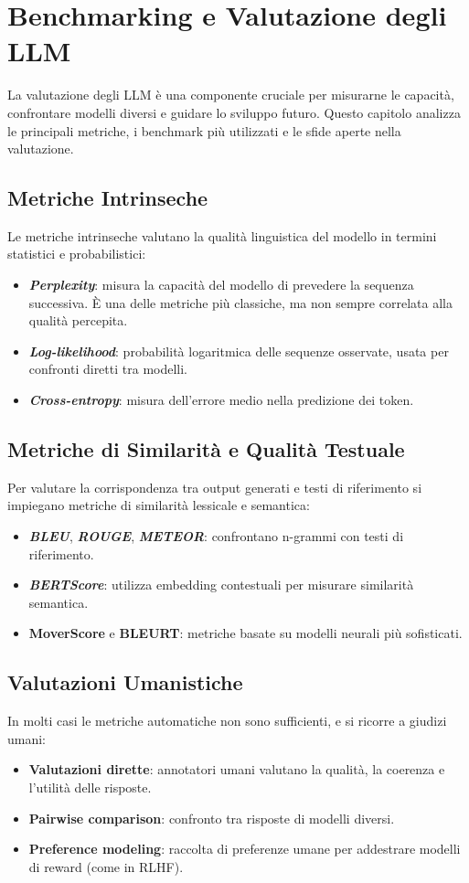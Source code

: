 \newpage
\section{Benchmarking e Valutazione degli LLM}

La valutazione degli LLM è una componente cruciale per misurarne le capacità, 
confrontare modelli diversi e guidare lo sviluppo futuro. 
Questo capitolo analizza le principali metriche, i benchmark più utilizzati 
e le sfide aperte nella valutazione.

\subsection{Metriche Intrinseche}
Le metriche intrinseche valutano la qualità linguistica del modello 
in termini statistici e probabilistici:
\begin{itemize}
    \item \textbf{\textit{Perplexity}}: misura la capacità del modello di prevedere la sequenza successiva. 
    È una delle metriche più classiche, ma non sempre correlata alla qualità percepita.
    \item \textbf{\textit{Log-likelihood}}: probabilità logaritmica delle sequenze osservate, 
    usata per confronti diretti tra modelli.
    \item \textbf{\textit{Cross-entropy}}: misura dell'errore medio nella predizione dei token.
\end{itemize}

\subsection{Metriche di Similarità e Qualità Testuale}
Per valutare la corrispondenza tra output generati e testi di riferimento 
si impiegano metriche di similarità lessicale e semantica:
\begin{itemize}
    \item \textbf{\textit{BLEU}}, \textbf{\textit{ROUGE}}, \textbf{\textit{METEOR}}: confrontano n-grammi con testi di riferimento.
    \item \textbf{\textit{BERTScore}}: utilizza embedding contestuali per misurare similarità semantica.
    \item \textbf{MoverScore} e \textbf{BLEURT}: metriche basate su modelli neurali più sofisticati.
\end{itemize}

\subsection{Valutazioni Umanistiche}
In molti casi le metriche automatiche non sono sufficienti, 
e si ricorre a giudizi umani:
\begin{itemize}
    \item \textbf{Valutazioni dirette}: annotatori umani valutano la qualità, la coerenza e l'utilità delle risposte.
    \item \textbf{Pairwise comparison}: confronto tra risposte di modelli diversi.
    \item \textbf{Preference modeling}: raccolta di preferenze umane per addestrare modelli di reward (come in RLHF).
\end{itemize}


